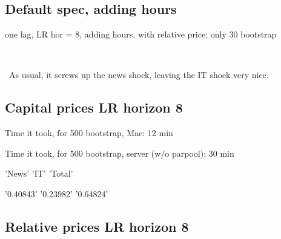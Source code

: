 \documentclass{article}
\def \ourFigPath {../../}
\begin{document}
\newpage
	\subsection{Default spec, adding hours}
	\noindent one lag, LR hor = 8, adding hours, with relative price; only 30 bootstrap
	
	\
	
	
	
	
	\begin{figure}[h!]
\centering
{} \hspace{.2in%
} 
\end{figure}

\
As usual, it screws up the news shock, leaving the IT shock very nice. 



\newpage
\subsection{Capital prices LR horizon 8}
\noindent Time it took, for 500 bootstrap, Mac: 12 min

\noindent  Time it took, for 500 bootstrap, server (w/o parpool): 30 min


\noindent  'News'       'IT'        'Total' 

\noindent  '0.40843'    '0.23982'    '0.64824'




\begin{figure}[h!]
	\centering
	 \hspace{.2in%
	} 
\end{figure}


\newpage
\subsection{Relative prices LR horizon 8}





\begin{figure}[h!]
	\centering
	 \hspace{.2in%
	} 
\end{figure}
	
	
		
	
	
\end{document}
